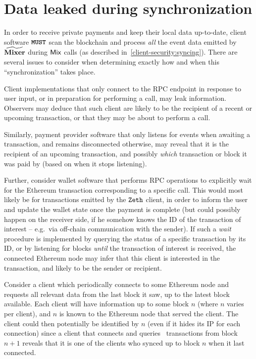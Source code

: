 \section{Data leaked during synchronization}\label{appendix:sca-attacks:synchronization}

In order to receive private payments and keep their local data up-to-date, \zeth{} client software $\textbf{\texttt{MUST}}{}$ scan the blockchain and process \emph{all} the event data emitted by $\widetilde{\mathbf{Mixer}}$ during $\mathsf{Mix}$ calls (as described in~\cref{client-security:syncing}). There are several issues to consider when determining exactly how and when this ``synchronization'' takes place.

Client implementations that only connect to the RPC endpoint in response to user input, or in preparation for performing a \mix{} call, may leak information. Observers may deduce that such client are likely to be the recipient of a recent or upcoming transaction, or that they may be about to perform a \mix{} call.

Similarly, payment provider software that only listens for events when awaiting a transaction, and remains disconnected otherwise, may reveal that it is the recipient of an upcoming transaction, and possibly \emph{which} transaction or block it was paid by (based on when it stops listening).

Further, consider wallet software that performs RPC operations to explicitly wait for the Ethereum transaction corresponding to a specific \mix{} call. This would most likely be for transactions emitted by the $\texttt{Zeth}$ client, in order to inform the user and update the wallet state once the payment is complete (but could possibly happen on the receiver side, if he somehow knows the ID of the transaction of interest -- e.g.~via off-chain communication with the sender). If such a \emph{wait} procedure is implemented by querying the status of a specific transaction by its ID, or by listening for blocks \emph{until} the transaction of interest is received, the connected Ethereum node may infer that this client is interested in the transaction, and likely to be the sender or recipient.

Consider a client which periodically connects to some Ethereum node and requests all relevant data from the last block it saw, up to the latest block available. Each client will have information up to some block $n$ (where $n$ varies per client), and $n$ is known to the Ethereum node that served the client.  The client could then potentially be identified by $n$ (even if it hides its IP for each connection) since a client that connects and queries \zeth~transactions from block $n + 1$ reveals that it is one of the clients who synced up to block $n$ when it last connected.

